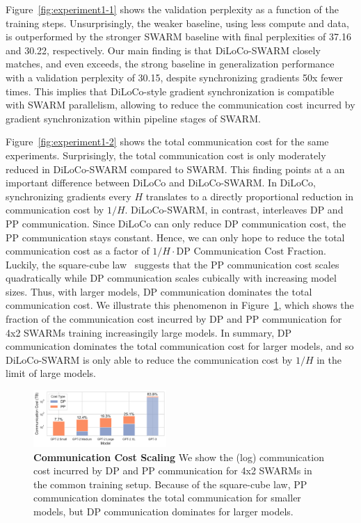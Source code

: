 \documentclass{article}
\begin{document}
Figure~\ref{fig:experiment1-1} shows the validation perplexity as a function of
the training steps. Unsurprisingly, the weaker baseline, using less compute and
data, is outperformed by the stronger SWARM baseline with final perplexities of 
37.16 and 30.22, respectively. Our main finding is that DiLoCo-SWARM closely
matches, and even exceeds, the strong baseline in generalization performance
with a validation perplexity of 30.15, despite synchronizing gradients 50x fewer
times. This implies that DiLoCo-style gradient synchronization is compatible
with SWARM parallelism, allowing to reduce the communication cost incurred by 
gradient synchronization within pipeline stages of SWARM.

Figure~\ref{fig:experiment1-2} shows the total communication cost for the same
experiments. Surprisingly, the total communication cost is only moderately
reduced in DiLoCo-SWARM compared to SWARM. This finding points at a an important
difference between DiLoCo and DiLoCo-SWARM. In DiLoCo, synchronizing gradients
every $H$ translates to a directly proportional reduction in communication cost
by $1/H$. DiLoCo-SWARM, in contrast, interleaves DP and PP communication. Since
DiLoCo can only reduce DP communication cost, the PP communication stays
constant.  Hence, we can only hope to reduce the total communication cost as a
factor of $1/H \cdot \text{DP Communication Cost Fraction}$. Luckily, the
square-cube law~\cite{ryabinin2023swarm} suggests that the PP communication cost
scales quadratically while DP communication scales cubically with increasing
model sizes. Thus, with larger models, DP communication dominates the total
communication cost. We illustrate this phenomenon in
Figure~\ref{fig:square-cube-law}, which shows the fraction of the communication
cost incurred by DP and PP communication for 4x2 SWARMs training increasingily
large models. In summary, DP communication dominates the total communication
cost for larger models, and so DiLoCo-SWARM is only able to reduce the
communication cost by $1/H$ in the limit of large models.

\begin{figure}[ht]
  \centering
  \includegraphics[width=0.45\textwidth]{figures/square-cube-law.pdf}
  \caption{\textbf{Communication Cost Scaling} We show the (log) communication
  cost incurred by DP and PP communication for 4x2 SWARMs in the common training
  setup. Because of the square-cube law, PP communication dominates the total communication for smaller models, but DP communication dominates for larger models.} 
  \label{fig:square-cube-law}
\end{figure}
\end{document}
